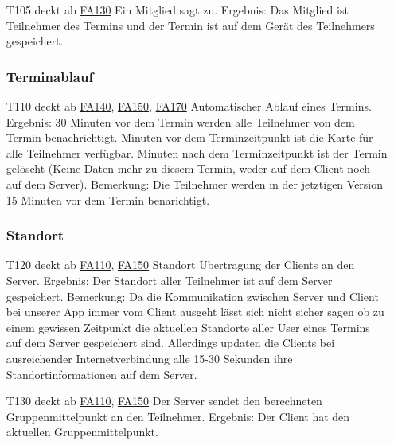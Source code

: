 \documentclass{scrartcl}
\begin{document}
\begin{itemize}
	\item[T105] deckt ab \hyperlink{FA130}{FA130}  \newline
	Ein Mitglied sagt zu.  \newline
	Ergebnis: Das Mitglied ist Teilnehmer des Termins und der Termin ist auf dem Gerät des Teilnehmers gespeichert.
	
	\subsubsection{Terminablauf}
	
	\item[T110] deckt ab \hyperlink{FA140}{FA140}, \hyperlink{FA150}{FA150}, \hyperlink{FA170}{FA170} \newline
	Automatischer Ablauf eines Termins. \newline
	Ergebnis: 30 Minuten vor dem Termin werden alle Teilnehmer von dem Termin benachrichtigt.   Minuten vor dem Terminzeitpunkt ist die Karte für alle Teilnehmer verfügbar.   Minuten nach dem Terminzeitpunkt ist der Termin gelöscht (Keine Daten mehr zu diesem Termin, weder auf 					dem Client noch auf dem Server).
	Bemerkung: Die Teilnehmer werden in der jetztigen Version 15 Minuten vor dem Termin benarichtigt. 
	
	\subsubsection{Standort}
	\item[T120] deckt ab \hyperlink{FA110}{FA110}, \hyperlink{FA150}{FA150} \newline
	Standort Übertragung der Clients an den Server.  \newline
	Ergebnis: Der Standort aller Teilnehmer ist auf dem Server gespeichert. \newline
	Bemerkung: Da die Kommunikation zwischen Server und Client bei unserer App immer vom Client ausgeht lässt sich nicht sicher sagen ob zu einem gewissen Zeitpunkt die aktuellen Standorte aller User eines Termins auf dem Server gespeichert sind. Allerdings updaten die Clients bei ausreichender Internetverbindung alle 15-30 Sekunden ihre Standortinformationen auf dem Server.
	
	\item[T130]  deckt ab \hyperlink{FA110}{FA110}, \hyperlink{FA150}{FA150} \newline
	Der Server sendet den berechneten Gruppenmittelpunkt an den Teilnehmer. \newline
	Ergebnis: Der Client hat den aktuellen Gruppenmittelpunkt.
	
\end{itemize}	
\end{document}
